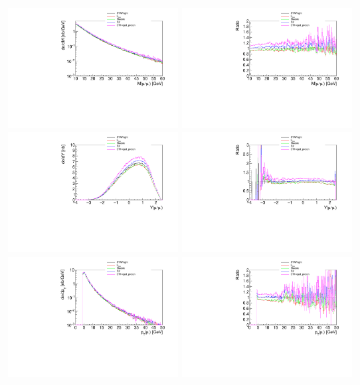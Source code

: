 \begin{figure}[h!]
\includegraphics[width=0.4\textwidth]{figures/Mll_elastic_cut.pdf}
\includegraphics[width=0.4\textwidth]{figures/RatioMll_elastic_cut.pdf}
\includegraphics[width=0.4\textwidth]{figures/Yll_elastic_cut.pdf}
\includegraphics[width=0.4\textwidth]{figures/RatioYll_elastic_cut.pdf}
\includegraphics[width=0.4\textwidth]{figures/pTl_elastic_cut.pdf}
\includegraphics[width=0.4\textwidth]{figures/RatiopTl_elastic_cut.pdf}

\end{figure}
